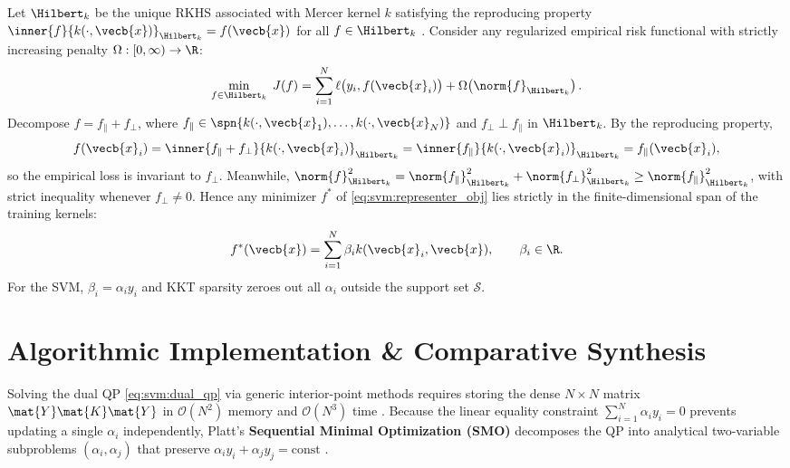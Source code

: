 \documentclass[../../../../master.tex]{subfiles}
\begin{document}
\begin{coremath}
Let $\Hilbert_k$ be the unique RKHS associated with Mercer kernel $k$ satisfying the reproducing property $\inner{f}{k(\cdot, \vecb{x})}_{\Hilbert_k} = f(\vecb{x})$ for all $f \in \Hilbert_k$ . Consider any regularized empirical risk functional with strictly increasing penalty $\Omega : [0, \infty) \to \R$:
\begin{equation}
  \min_{f \in \Hilbert_k} \; J(f) = \sum_{i=1}^N \ell\big(y_i, f(\vecb{x}_i)\big) + \Omega\!\left(\norm{f}_{\Hilbert_k}\right).
  \label{eq:svm:representer_obj}
\end{equation}
Decompose $f = f_{\parallel} + f_{\perp}$, where $f_{\parallel} \in \spn\{k(\cdot, \vecb{x}_1), \dots, k(\cdot, \vecb{x}_N)\}$ and $f_{\perp} \perp f_{\parallel}$ in $\Hilbert_k$. By the reproducing property,
\begin{equation}
  f(\vecb{x}_i) = \inner{f_{\parallel} + f_{\perp}}{k(\cdot, \vecb{x}_i)}_{\Hilbert_k} = \inner{f_{\parallel}}{k(\cdot, \vecb{x}_i)}_{\Hilbert_k} = f_{\parallel}(\vecb{x}_i),
\end{equation}
so the empirical loss is invariant to $f_{\perp}$. Meanwhile, $\norm{f}_{\Hilbert_k}^2 = \norm{f_{\parallel}}_{\Hilbert_k}^2 + \norm{f_{\perp}}_{\Hilbert_k}^2 \ge \norm{f_{\parallel}}_{\Hilbert_k}^2$, with strict inequality whenever $f_{\perp} \ne 0$. Hence any minimizer $f^*$ of \eqref{eq:svm:representer_obj} lies strictly in the finite-dimensional span of the training kernels:
\begin{equation}
  f^*(\vecb{x}) = \sum_{i=1}^N \beta_i k(\vecb{x}_i, \vecb{x}), \qquad \beta_i \in \R.
  \label{eq:svm:representer_sol}
\end{equation}
For the SVM, $\beta_i = \alpha_i y_i$ and KKT sparsity zeroes out all $\alpha_i$ outside the support set $\mathcal{S}$.
\end{coremath}

\section{Algorithmic Implementation \& Comparative Synthesis}

Solving the dual QP \eqref{eq:svm:dual_qp} via generic interior-point methods requires storing the dense $N \times N$ matrix $\mat{Y}\mat{K}\mat{Y}$ in $\mathcal{O}(N^2)$ memory and $\mathcal{O}(N^3)$ time . Because the linear equality constraint $\sum_{i=1}^N \alpha_i y_i = 0$ prevents updating a single $\alpha_i$ independently, Platt's \textbf{Sequential Minimal Optimization (SMO)} decomposes the QP into analytical two-variable subproblems $(\alpha_i, \alpha_j)$ that preserve $\alpha_i y_i + \alpha_j y_j = \text{const}$ .
\end{document}
